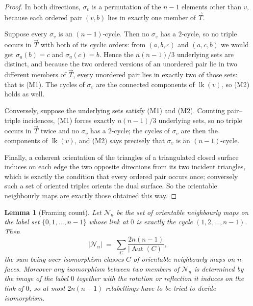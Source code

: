 \documentclass[11pt,reqno]{amsart}
\theoremstyle{plain}
\newtheorem{lemma}[theorem]{Lemma}
\theoremstyle{definition}
\newcommand{\Aut}{\operatorname{Aut}}
\newcommand{\link}{\operatorname{lk}}
\begin{document}
\begin{proof}
In both directions, $\sigma_v$ is a permutation of the $n-1$ elements other than $v$, because each
ordered pair $(v,b)$ lies in exactly one member of $\vec T$.

Suppose every $\sigma_v$ is an $(n-1)$-cycle. Then no $\sigma_v$ has a $2$-cycle, so no triple occurs
in $\vec T$ with both of its cyclic orders: from $(a,b,c)$ and $(a,c,b)$ we would get $\sigma_a(b)=c$
and $\sigma_a(c)=b$. Hence the $n(n-1)/3$ underlying sets are distinct, and because the two ordered
versions of an unordered pair lie in two different members of $\vec T$, every unordered pair lies in
exactly two of those sets: that is (M1). The cycles of $\sigma_v$ are the connected components of
$\link(v)$, so (M2) holds as well.

Conversely, suppose the underlying sets satisfy (M1) and (M2). Counting pair--triple incidences, (M1)
forces exactly $n(n-1)/3$ underlying sets, so no triple occurs in $\vec T$ twice and no $\sigma_v$
has a $2$-cycle; the cycles of $\sigma_v$ are then the components of $\link(v)$, and (M2) says
precisely that $\sigma_v$ is an $(n-1)$-cycle.

Finally, a coherent orientation of the triangles of a triangulated closed surface induces on each edge
the two opposite directions from its two incident triangles, which is exactly the condition that every
ordered pair occurs once; conversely such a set of oriented triples orients the dual surface. So the
orientable neighbourly maps are exactly those obtained this way.
\end{proof}

\begin{lemma}[Framing count]\label{lem:framing}
Let $\mathcal{N}_n$ be the set of \emph{orientable} neighbourly maps on the label set
$\{0,1,\dots,n-1\}$ whose link at $0$ is exactly the cycle $(1,2,\dots,n-1)$. Then
\[
  |\mathcal{N}_n| \;=\; \sum_{C}\frac{2n(n-1)}{|\Aut(C)|},
\]
the sum being over isomorphism classes $C$ of orientable neighbourly maps on $n$ faces. Moreover any isomorphism
between two members of $\mathcal{N}_n$ is determined by the image of the label $0$ together with the
rotation or reflection it induces on the link of $0$, so at most $2n(n-1)$ relabellings have to be
tried to decide isomorphism.
\end{lemma}
\end{document}
